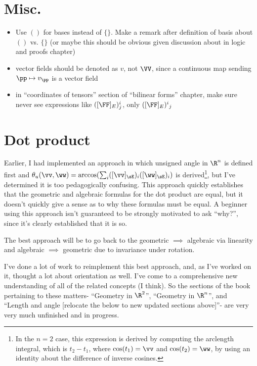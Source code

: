\section*{Misc.}

\begin{itemize}	
    \item Use $()$ for bases instead of $\{\}$. Make a remark after definition of basis about $()$ vs. $\{\}$ (or maybe this should be obvious given discussion about in logic and proofs chapter)
    \item vector fields should be denoted as $v$, not $\VV$, since a continuous map sending $\pp \mapsto v_\pp$ is a vector field
    \item in ``coordinates of tensors'' section of ``bilinear forms'' chapter, make sure never see expressions like $([\FF]_E)^i_j$, only $([\FF]_E)^i{}_j$
\end{itemize}

\newpage

\section*{Dot product}

Earlier, I had implemented an approach in which unsigned angle in $\R^n$ is defined first and $\theta_u(\vv, \ww) = \arccos(\sum_i ([\vv]_\sE)_i ([\ww]_\sE)_i)$ is derived\footnote{In the $n = 2$ case, this expression is derived by computing the arclength integral, which is $t_2 - t_1$, where $\cos(t_1) = \vv$ and $\cos(t_2) = \ww$, by using an identity about the difference of inverse cosines.}, but I've determined it is too pedagogically confusing. This approach quickly establishes that the geometric and algebraic formulas for the dot product are equal, but it doesn’t quickly give a sense as to why these formulas must be equal. A beginner using this approach isn’t guaranteed to be strongly motivated to ask ``why?'', since it’s clearly established that it is so.

The best approach will be to go back to the geometric $\implies$ algebraic via linearity and algebraic $\implies$ geometric due to invariance under rotation.

I've done a lot of work to reimplement this best approach, and, as I've worked on it, thought a lot about orientation as well. I've come to a comprehensive new understanding of all of the related concepts (I think). So the sections of the book pertaining to these matters- ``Geometry in $\R^2$'', ``Geometry in $\R^n$'', and ``Length and angle [relocate the below to new updated sections above]''- are very very much unfinished and in progress. 

